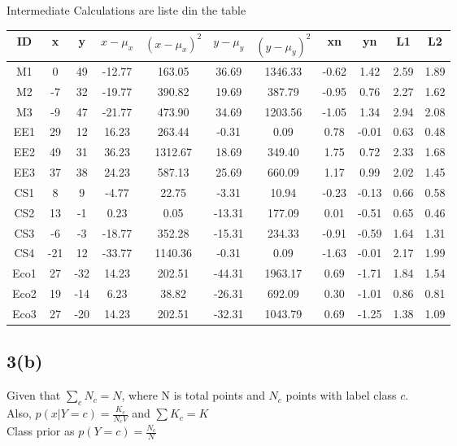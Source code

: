 \documentclass[10pt,letterpaper]{article}
\begin{document}
\newpage
Intermediate Calculations are liste din the table
\begin{center}
\begin{tabular}{c|c|c|c|c|c|c|c|c|c|c}
\hline ID & x & y & $x-\mu_x$ & $(x-\mu_x)^2$ & $y-\mu_y$& $(y-\mu_y) ^2$ & xn & yn & L1 & L2\\
\hline M1 & 0 & 49 & -12.77 & 163.05 & 36.69 & 1346.33 & -0.62 & 1.42 & 2.59 & 1.89\\
\hline M2 & -7 & 32 & -19.77 & 390.82 & 19.69 & 387.79 & -0.95 & 0.76 & 2.27 & 1.62\\  
\hline M3 & -9 & 47 & -21.77 & 473.90 & 34.69 & 1203.56 & -1.05 & 1.34 & 2.94 & 2.08\\   
\hline EE1 & 29 & 12 & 16.23 & 263.44 & -0.31 & 0.09 & 0.78 & -0.01 & 0.63 & 0.48\\
\hline EE2 & 49 & 31 & 36.23 & 1312.67 & 18.69 & 349.40 & 1.75 & 0.72 & 2.33 & 1.68\\ 
\hline EE3 & 37 & 38 & 24.23 & 587.13 & 25.69 & 660.09 & 1.17 & 0.99 & 2.02 & 1.45\\ 
\hline CS1 & 8 & 9 & -4.77 & 22.75 & -3.31 & 10.94 & -0.23 & -0.13 & 0.66 & 0.58 \\  
\hline CS2 & 13 & -1 & 0.23 & 0.05 & -13.31 & 177.09 & 0.01 & -0.51 & 0.65 & 0.46\\  
\hline CS3 & -6 & -3 & -18.77 & 352.28 & -15.31 & 234.33 & -0.91 & -0.59 & 1.64 & 1.31\\   
\hline CS4 & -21 & 12 & -33.77 & 1140.36 & -0.31 & 0.09 & -1.63 & -0.01 & 2.17 & 1.99\\ 
\hline Eco1 & 27 & -32 & 14.23 & 202.51 & -44.31 & 1963.17 & 0.69 & -1.71 & 1.84 & 1.54\\ 
\hline Eco2 & 19 & -14 & 6.23 & 38.82 & -26.31 & 692.09 & 0.30 & -1.01 & 0.86 & 0.81\\
\hline Eco3 & 27 & -20 & 14.23 & 202.51 & -32.31 & 1043.79 & 0.69 & -1.25 & 1.38 & 1.09\\ 
\hline
\end{tabular}
\end{center}

\subsection{3(b)}
Given that $\sum_c N_c=N$, where N is total points and $N_c$ points with label class $c$.\\
		Also, $p(x|Y=c)=\frac{K_c}{N_cV}$ 	and $\sum K_c=K$\\
		Class prior as $p(Y=c)=\frac{N_c}{N}$\\
		
\end{document}
